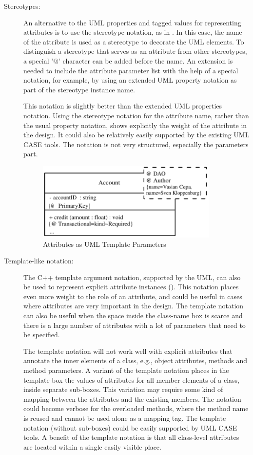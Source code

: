 \begin{description}
\item[Stereotypes:] An alternative to the UML properties and tagged
  values for representing attributes is to use the stereotype notation, as in  \cite{berner99}. In this case, the name of the attribute is used as a stereotype to decorate
  the UML elements. To distinguish a stereotype that serves as an attribute from other
  stereotypes, a special '@' character can be added before the name. An
  extension is needed to include the attribute parameter list with the help of a
  special notation, for example, by using an extended UML property notation as
  part of the stereotype instance name.

This notation is slightly better than the extended UML properties notation. Using the stereotype notation for the attribute name, rather than the usual property notation, shows explicitly the weight of the attribute in the design. It could also be relatively easily supported by the existing UML CASE tools. The notation is not very structured, especially the parameters part. 

\begin{figure}[ht]
		\centering
		\includegraphics[width=9cm,height=!]{append1/template}
	\caption{Attributes as UML Template Parameters}
	\label{fig:template}
\end{figure}

\item[Template-like notation:] The C++ template argument notation,
  supported by the UML, can also be used to represent explicit attribute instances (). This
  notation places even more weight to the role of an attribute, and could be
  useful in cases where attributes are very important in the design. The template notation can also be useful when the space inside the class-name box is scarce and there is a large number of attributes with a lot of parameters that need to be specified.
 
 The template
  notation will not work well with explicit attributes that annotate the inner
  elements of a class, e.g., object attributes, methods and method
  parameters. A variant of the template notation places in the template box the
  values of attributes for all member elements of a class, inside separate sub-boxes.
  This variation may require some kind of mapping between the
  attributes and the existing members. The notation could become verbose for
  the overloaded methods, where the method name is reused and cannot be used alone as a
  mapping tag. The template notation (without sub-boxes) could be easily supported by
  UML CASE tools. A benefit of the template notation is that all class-level attributes are located within a single easily visible place.


\end{description}
